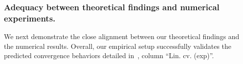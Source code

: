 \documentclass[11pt]{amsart}
\newcommand{\cmark}{\textcolor{darkgreen}{\ding{51}}}
\newcommand{\cmarkm}{\textcolor{darkorange}{(\ding{51})}}
\newcommand{\xmark}{\textcolor{darkred}{\ding{55}}}
\newcommand{\es}[1]{{\color{blue}#1}}
\newcommand{\esb}[2]{{\color{blue}\sout{#1}#2}}
\begin{document}

\subsubsection{Adequacy between theoretical findings and numerical experiments.}\label{sec:exp_comment} 
We next demonstrate the close alignment between our theoretical findings and the numerical results. Overall, our empirical setup successfully validates the predicted convergence behaviors detailed in~, column ``Lin. cv. (exp)''.
\end{document}
